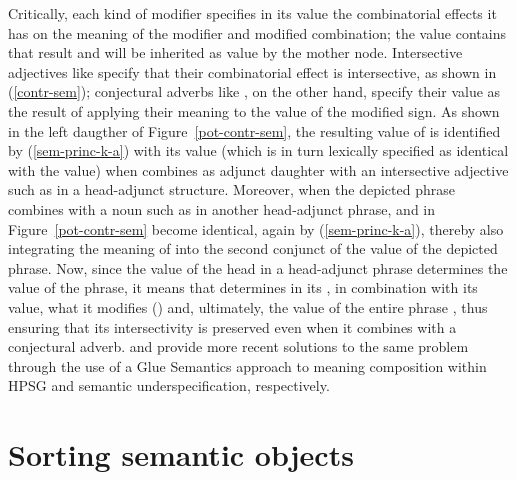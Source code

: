 \documentclass[output=paper
	        ,collection
	        ,collectionchapter
 	        ,biblatex
                ,babelshorthands
                ,newtxmath
                ,draftmode
                ,colorlinks, citecolor=brown
]{langscibook}
\begin{document}
Critically, each kind of modifier specifies in its  value the combinatorial effects it has on the meaning of the modifier and modified combination; the  value contains that result and will be inherited as  value by the mother node. Intersective adjectives like  specify that their combinatorial effect is intersective, as shown in (\ref{contr-sem}); conjectural adverbs like , on the other hand, specify their  value as the result of applying their meaning to the  value of the modified sign. As shown in the left daugther of Figure~\ref{pot-contr-sem}, the resulting  value of  is identified by (\ref{sem-princ-k-a}) with its  value (which is in turn lexically specified as identical with the  value) when  combines as adjunct daughter with an intersective adjective such as  in a head-adjunct structure. Moreover, when the depicted phrase  combines with a noun such as  in another head-adjunct phrase,  and  in Figure~\ref{pot-contr-sem} become identical, again by (\ref{sem-princ-k-a}), thereby also integrating the meaning of  into the second conjunct of the  value of the depicted phrase. Now, since the  value of the head in a head-adjunct phrase determines the  value of the phrase, it means that  determines in its , in combination with its  value, what it modifies () and, ultimately, the  value of the entire phrase , thus ensuring that its intersectivity is preserved even when it combines with a conjectural adverb. \citet{AsudehandCrouch2002} and \citet{Egg2004a} provide more recent solutions to the same problem through the use of a Glue Semantics approach to meaning composition within HPSG and semantic underspecification, respectively.

\section{Sorting semantic objects}
\end{document}
